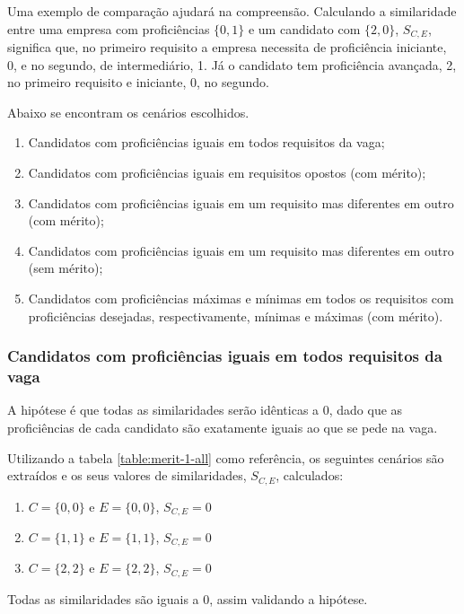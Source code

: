 \documentclass[preprint,12pt]{elsarticle}
\begin{document}
Uma exemplo de comparação ajudará na compreensão. Calculando a similaridade entre uma empresa com proficiências $\{0, 1\}$ e um candidato com $\{2, 0\}$, $ S_{C,E}$, significa que, no primeiro requisito a empresa necessita de proficiência iniciante, 0, e no segundo, de intermediário, 1. Já o candidato tem proficiência avançada, 2, no primeiro requisito e iniciante, 0, no segundo. 

Abaixo se encontram os cenários escolhidos.

\begin{enumerate}
    \item Candidatos com proficiências iguais em todos requisitos da vaga;
    \item Candidatos com proficiências iguais em requisitos opostos (com mérito);
    \item Candidatos com proficiências iguais em um requisito mas diferentes em outro (com mérito);
    \item Candidatos com proficiências iguais em um requisito mas diferentes em outro (sem mérito);
    \item Candidatos com proficiências máximas e mínimas em todos os requisitos com proficiências desejadas, respectivamente, mínimas e máximas (com mérito).
\end{enumerate}

\subsubsection{Candidatos com proficiências iguais em todos requisitos da vaga}

A hipótese é que todas as similaridades serão idênticas a 0, dado que as proficiências de cada candidato são exatamente iguais ao que se pede na vaga. 

Utilizando a tabela \ref{table:merit-1-all} como referência, os seguintes cenários são extraídos e os seus valores de similaridades, $S_{C, E}$, calculados:

\begin{enumerate}
    \item $C = \{0,0\}$ e $E = \{0,0\}$, $S_{C,E} = 0$
    \item $C = \{1,1\}$ e $E = \{1,1\}$, $S_{C,E} = 0$
    \item $C = \{2,2\}$ e $E = \{2,2\}$, $S_{C,E} = 0$
\end{enumerate}

Todas as similaridades são iguais a 0, assim validando a hipótese.
\end{document}
